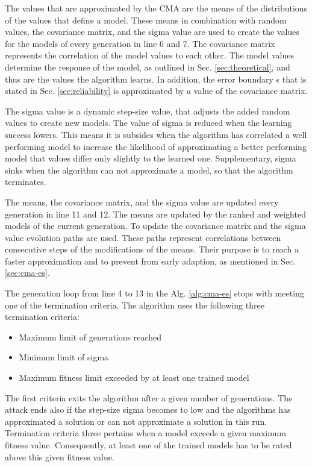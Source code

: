 The values that are approximated by the \ac{CMA} are the means of the distributions of the values that define a model.
These means in combination with random values, the covariance matrix, and the sigma value are used to create the values for the models of every generation in line 6 and 7. %
The covariance matrix represents the correlation of the model values to each other.
The model values determine the response of the \apuf model, as outlined in Sec. \ref{sec:theoretical}, and thus are the values the algorithm learns.
In addition, the error boundary $\epsilon$ that is stated in Sec. \ref{sec:reliability} is approximated by a value of the covariance matrix.

The sigma value is a dynamic step-size value, that adjusts the added random values to create new models.
The value of sigma is reduced when the learning success lowers.
This means it is subsides when the algorithm has correlated a well performing model to increase the likelihood of approximating a better performing model that values differ only slightly to the learned one. %
Supplementary, sigma sinks when the algorithm can not approximate a model, so that the algorithm terminates.

The means, the covariance matrix, and the sigma value are updated every generation in line 11 and 12.
The means are updated by the ranked and weighted models of the current generation. %
To update the covariance matrix and the sigma value evolution paths are used.
These paths represent correlations between consecutive steps of the modifications of the means. 
Their purpose is to reach a faster approximation and to prevent from early adaption, as mentioned in Sec. \ref{sec:cma-es}.

The generation loop from line 4 to 13 in the Alg. \ref{alg:cma-es} stops with meeting one of the termination criteria.
The algorithm uses the following three termination criteria:

\begin{itemize}
\item Maximum limit of generations reached
\item Minimum limit of sigma
\item Maximum fitness limit exceeded by at least one trained model
\end{itemize}

The first criteria exits the algorithm after a given number of generations.
The attack ends also if the step-size sigma becomes to low and the algorithms has approximated a solution or can not approximate a solution in this run. %
Termination criteria three pertains when a model exceeds a given maximum fitness value.
Consequently, at least one of the trained models has to be rated above this given fitness value.


